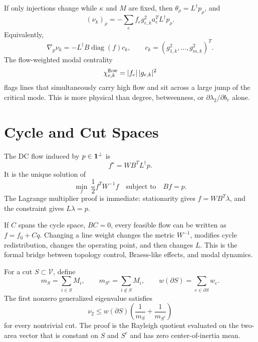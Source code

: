 If only injections change while \(\kappa\) and \(M\) are fixed, then
\(\theta_\rho=L^\dagger p_\rho\), and
\begin{equation}
  (\nu_k)_\rho
  =
  -
  \sum_e f_e g_{e,k}^2 a_e^TL^\dagger p_\rho.
  \label{eq:graph_injection_nu_rho}
\end{equation}
Equivalently,
\begin{equation}
  \nabla_p\nu_k
  =
  -L^\dagger B\operatorname{diag}(f)c_k,
  \qquad
  c_k=(g_{1,k}^2,\ldots,g_{m,k}^2)^T.
  \label{eq:graph_grad_p_nu}
\end{equation}
The flow-weighted modal centrality
\begin{equation}
  \chi_{e,k}^{\rm flow}
  =
  |f_e|\,|g_{e,k}|^2
  \label{eq:graph_flow_modal_centrality}
\end{equation}
flags lines that simultaneously carry high flow and sit across a large jump of
the critical mode. This is more physical than degree, betweenness, or
\(\partial\lambda_2/\partial b_e\) alone.

\section{Cycle and Cut Spaces}

The DC flow induced by \(p\in\mathbf 1^\perp\) is
\begin{equation}
  f^\star=W B^T L^\dagger p.
  \label{eq:graph_dc_flow}
\end{equation}
It is the unique solution of
\begin{equation}
  \min_f\ \frac12 f^TW^{-1}f
  \quad
  \text{subject to}\quad Bf=p.
  \label{eq:graph_min_energy_flow}
\end{equation}
The Lagrange multiplier proof is immediate: stationarity gives
\(f=WB^T\lambda\), and the constraint gives \(L\lambda=p\).

If \(C\) spans the cycle space, \(BC=0\), every feasible flow can be written
as \(f=f_0+Cq\). Changing a line weight changes the metric \(W^{-1}\), modifies
cycle redistribution, changes the operating point, and then changes \(L\).
This is the formal bridge between topology control, Braess-like effects, and
modal dynamics.

For a cut \(S\subset\mathcal V\), define
\begin{equation}
  m_S=\sum_{i\in S}M_i,\qquad
  m_{S^c}=\sum_{i\notin S}M_i,\qquad
  w(\partial S)=\sum_{e\in\partial S}w_e.
  \label{eq:graph_cut_quantities}
\end{equation}
The first nonzero generalized eigenvalue satisfies
\begin{equation}
  \nu_2
  \le
  w(\partial S)
  \left(
  \frac1{m_S}+\frac1{m_{S^c}}
  \right)
  \label{eq:graph_inertia_cut_bound}
\end{equation}
for every nontrivial cut. The proof is the Rayleigh quotient evaluated on the
two-area vector that is constant on \(S\) and \(S^c\) and has zero
center-of-inertia mean.

